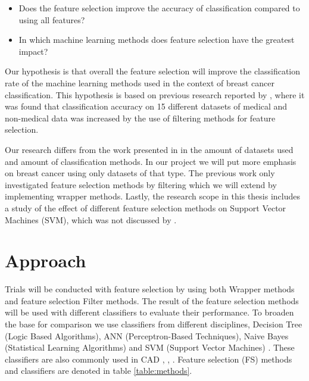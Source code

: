 \begin{itemize}
  \item Does the feature selection improve the accuracy of classification compared to using all features?
  \item In which machine learning methods does feature selection have the greatest impact?
\end{itemize}

Our hypothesis is that overall the feature selection will improve the classification rate of the machine learning methods used in the context of breast cancer classification. This hypothesis is based on previous research reported by \textcite{karabulut2012}, where it was found that classification accuracy on 15 different datasets of medical and non-medical data was increased by the use of filtering methods for feature selection.

Our research differs from the work presented in \parencite{karabulut2012} in the amount of datasets used and amount of classification methods. In our project we will put more emphasis on breast cancer using only datasets of that type. The previous work only investigated feature selection methods by filtering which we will extend by implementing wrapper methods. Lastly, the research scope in this thesis includes a study of the effect of different feature selection methods on Support Vector Machines (SVM), which was not discussed by \parencite{karabulut2012}.


\section{Approach}

Trials will be conducted with feature selection by using both Wrapper methods and feature selection Filter methods. The result of the feature selection methods will be used with different classifiers to evaluate their performance. To broaden the base for comparison we use classifiers from different disciplines, Decision Tree (Logic Based Algorithms), ANN (Perceptron-Based Techniques), Naive Bayes (Statistical Learning Algorithms) and SVM (Support Vector Machines) \parencite{wallace2007}. These classifiers are also commonly used in CAD \parencite{ramos2012}, \parencite{akay2009}, \parencite{li2007}. Feature selection (FS) methods and classifiers are denoted in table \ref{table:methods}.

